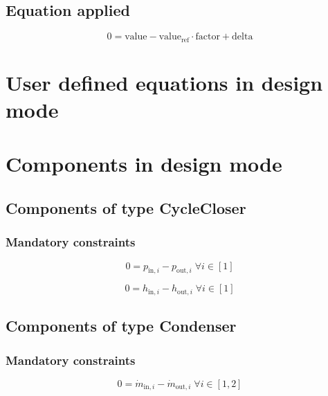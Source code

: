\subsection{Equation applied}

\begin{equation}
\label{eq:Connection_ref}
0 = \text{value} - \text{value}_\mathrm{ref} \cdot \mathrm{factor} + \text{delta}
\end{equation}

\section{User defined equations in design mode}

\section{Components in design mode}

\subsection{Components of type CycleCloser}

\subsubsection{Mandatory constraints}

\begin{equation}
\label{eq:CycleCloser_pressure_equality_constraints}
0=p_{\mathrm{in,}i}-p_{\mathrm{out,}i}\; \forall i \in [1]
\end{equation}

\begin{equation}
\label{eq:CycleCloser_enthalpy_equality_constraints}
0=h_{\mathrm{in,}i}-h_{\mathrm{out,}i}\; \forall i \in [1]
\end{equation}


\subsection{Components of type Condenser}

\subsubsection{Mandatory constraints}

\begin{equation}
\label{eq:Condenser_mass_flow_constraints}
0=\dot{m}_{\mathrm{in,}i}-\dot{m}_{\mathrm{out,}i}\; \forall i \in [1, 2]
\end{equation}

